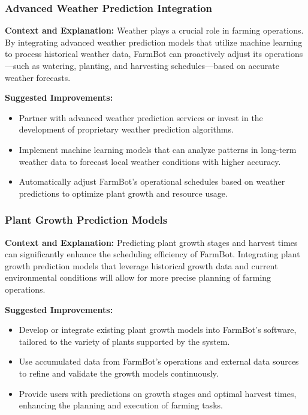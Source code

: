\subsubsection{Advanced Weather Prediction Integration}
\textbf{Context and Explanation:} Weather plays a crucial role in farming operations. By integrating advanced weather prediction models that utilize machine learning to process historical weather data, FarmBot can proactively adjust its operations—such as watering, planting, and harvesting schedules—based on accurate weather forecasts.

\textbf{Suggested Improvements:}
\begin{itemize}
    \item Partner with advanced weather prediction services or invest in the development of proprietary weather prediction algorithms.
    \item Implement machine learning models that can analyze patterns in long-term weather data to forecast local weather conditions with higher accuracy.
    \item Automatically adjust FarmBot's operational schedules based on weather predictions to optimize plant growth and resource usage.
\end{itemize}

\subsubsection{Plant Growth Prediction Models}
\textbf{Context and Explanation:} Predicting plant growth stages and harvest times can significantly enhance the scheduling efficiency of FarmBot. Integrating plant growth prediction models that leverage historical growth data and current environmental conditions will allow for more precise planning of farming operations.

\textbf{Suggested Improvements:}
\begin{itemize}
    \item Develop or integrate existing plant growth models into FarmBot's software, tailored to the variety of plants supported by the system.
    \item Use accumulated data from FarmBot's operations and external data sources to refine and validate the growth models continuously.
    \item Provide users with predictions on growth stages and optimal harvest times, enhancing the planning and execution of farming tasks.
\end{itemize}

